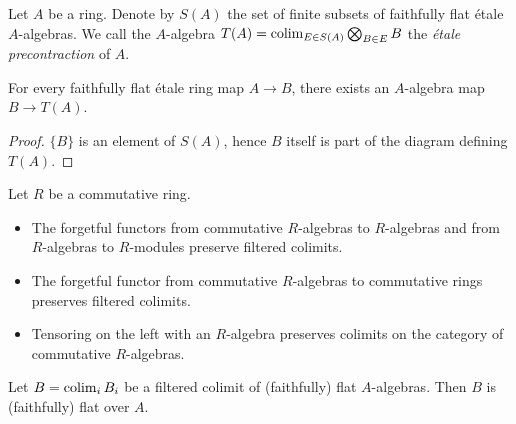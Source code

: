 \begin{definition}
    Let $A$ be a ring. Denote by $S(A)$ the set of finite subsets of faithfully flat étale $A$-algebras.
    We call the $A$-algebra $T(A) = \operatorname{colim}_{E \in S(A)} \bigotimes_{B \in E} B$ the \emph{étale precontraction} of
    $A$.
    \label{def:etale-precontraction}
    \leanok
\end{definition}

\begin{lemma}
    \label{lemma:etale-precontraction-semi-retraction}
    For every faithfully flat étale ring map $A \to B$, there exists an $A$-algebra map $B \to T(A)$.
    \leanok
\end{lemma}

\begin{proof}
    $\{B\}$ is an element of $S(A)$, hence $B$ itself is part of the diagram defining $T(A)$.
    \leanok
\end{proof}

\begin{lemma}
    Let $R$ be a commutative ring.
    \begin{itemize}
        \item The forgetful functors from commutative $R$-algebras to $R$-algebras and
            from $R$-algebras to $R$-modules preserve filtered colimits.
        \item The forgetful functor from commutative $R$-algebras to commutative rings
            preserves filtered colimits.
        \item Tensoring on the left with an $R$-algebra preserves colimits on the
            category of commutative $R$-algebras.
    \end{itemize}
    \label{lemma:commalgcat-colimits}
    \leanok
\end{lemma}

\begin{lemma}
    Let $B = \operatorname{colim}_i B_i$ be a filtered colimit of (faithfully) flat $A$-algebras. Then
    $B$ is (faithfully) flat over $A$.
    \label{lemma:ind-faithfully-flat}
    \leanok
\end{lemma}

